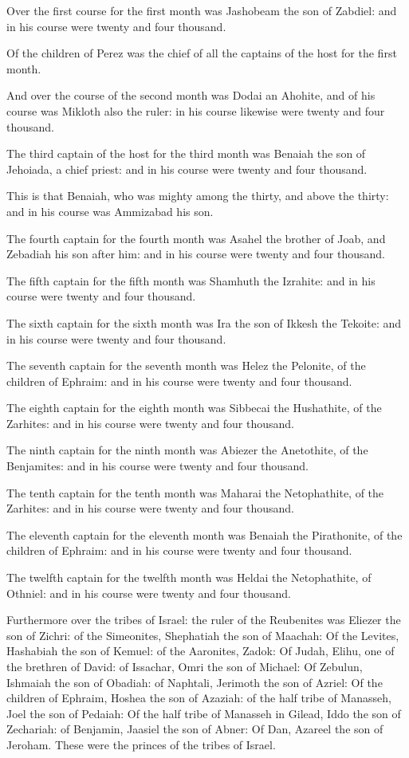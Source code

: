 \verse Over the first course for the first month was Jashobeam the son of Zabdiel: and in his course were twenty and four thousand.

\verse Of the children of Perez was the chief of all the captains of the host for the first month.

\verse And over the course of the second month was Dodai an Ahohite, and of his course was Mikloth also the ruler: in his course likewise were twenty and four thousand.

\verse The third captain of the host for the third month was Benaiah the son of Jehoiada, a chief priest: and in his course were twenty and four thousand.

\verse This is that Benaiah, who was mighty among the thirty, and above the thirty: and in his course was Ammizabad his son.

\verse The fourth captain for the fourth month was Asahel the brother of Joab, and Zebadiah his son after him: and in his course were twenty and four thousand.

\verse The fifth captain for the fifth month was Shamhuth the Izrahite: and in his course were twenty and four thousand.

\verse The sixth captain for the sixth month was Ira the son of Ikkesh the Tekoite: and in his course were twenty and four thousand.

\verse The seventh captain for the seventh month was Helez the Pelonite, of the children of Ephraim: and in his course were twenty and four thousand.

\verse The eighth captain for the eighth month was Sibbecai the Hushathite, of the Zarhites: and in his course were twenty and four thousand.

\verse The ninth captain for the ninth month was Abiezer the Anetothite, of the Benjamites: and in his course were twenty and four thousand.

\verse The tenth captain for the tenth month was Maharai the Netophathite, of the Zarhites: and in his course were twenty and four thousand.

\verse The eleventh captain for the eleventh month was Benaiah the Pirathonite, of the children of Ephraim: and in his course were twenty and four thousand.

\verse The twelfth captain for the twelfth month was Heldai the Netophathite, of Othniel: and in his course were twenty and four thousand.

\verse Furthermore over the tribes of Israel: the ruler of the Reubenites was Eliezer the son of Zichri: of the Simeonites, Shephatiah the son of Maachah: \verse Of the Levites, Hashabiah the son of Kemuel: of the Aaronites, Zadok: \verse Of Judah, Elihu, one of the brethren of David: of Issachar, Omri the son of Michael: \verse Of Zebulun, Ishmaiah the son of Obadiah: of Naphtali, Jerimoth the son of Azriel: \verse Of the children of Ephraim, Hoshea the son of Azaziah: of the half tribe of Manasseh, Joel the son of Pedaiah: \verse Of the half tribe of Manasseh in Gilead, Iddo the son of Zechariah: of Benjamin, Jaasiel the son of Abner: \verse Of Dan, Azareel the son of Jeroham. These were the princes of the tribes of Israel.

